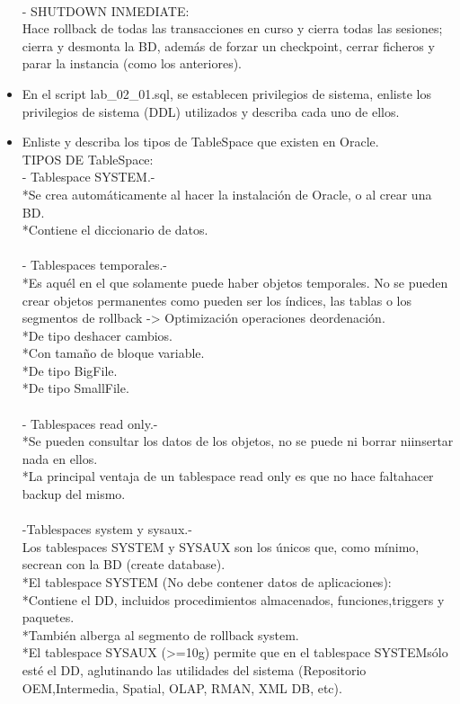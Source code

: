 \begin{itemize}
   \\- SHUTDOWN INMEDIATE:
   \\Hace rollback de todas las transacciones en curso y cierra todas las sesiones; cierra y desmonta la BD, además de forzar un checkpoint, cerrar ficheros y parar la instancia (como los anteriores).
   \\
   \item En el script lab_02_01.sql, se establecen privilegios de sistema, enliste los privilegios de sistema (DDL) 
   utilizados y describa cada uno de ellos.
   \\

   \item Enliste y describa los tipos de TableSpace que existen en Oracle.
   \\TIPOS DE TableSpace:
   \\- Tablespace SYSTEM.-
   \\*Se crea automáticamente al hacer la instalación de Oracle, o al crear una BD.
   \\*Contiene el diccionario de datos.
   \\
   \\- Tablespaces temporales.-
   \\*Es aquél en el que solamente puede haber objetos temporales. No se pueden crear objetos permanentes como pueden ser los índices, las tablas o los segmentos de rollback -> Optimización operaciones deordenación.
   \\*De tipo deshacer cambios.
   \\*Con tamaño de bloque variable.
   \\*De tipo BigFile.
   \\*De tipo SmallFile.
   \\
   \\- Tablespaces read only.-
   \\*Se pueden consultar los datos de los objetos, no se puede ni borrar niinsertar nada en ellos.
   \\*La principal ventaja de un tablespace read only es que no hace faltahacer backup del mismo.
   \\
   \\-Tablespaces system y sysaux.-
   \\Los tablespaces SYSTEM y SYSAUX son los únicos que, como mínimo, secrean con la BD (create database).
   \\*El tablespace SYSTEM (No debe contener datos de aplicaciones):
   \\*Contiene el DD, incluidos procedimientos almacenados, funciones,triggers y paquetes.
   \\*También alberga al segmento de rollback system.
   \\*El tablespace SYSAUX (>=10g) permite que en el tablespace SYSTEMsólo esté el DD, aglutinando las utilidades del sistema (Repositorio OEM,Intermedia, Spatial, OLAP, RMAN, XML DB, etc).
 \\
 \end{itemize}
